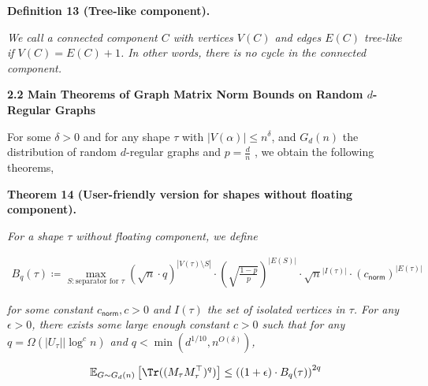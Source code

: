 

\par\medskip\noindent\textbf{
\textbf{Definition 13}\textbf{ }(Tree-like component)\textbf{.}
}\par



\emph{We call a connected component $C$ with vertices $V(C)$ and edges $E(C)$ tree-like if $V(C)=E(C)+1$. In other words, there is no cycle in the connected component.}\par







\par\medskip\noindent\textbf{
2.2 Main Theorems of Graph Matrix Norm Bounds on Random $d$-Regular Graphs}\par




For some $\delta>0$ and for any shape $\tau$ with $|V(\alpha)|\leq n^{\delta}$, and $G_{d}(n)$ the distribution of random $d$-regular graphs and $p=\frac{d}{n}$
, we obtain the following theorems,\par





\par\medskip\noindent\textbf{
\textbf{Theorem 14}\textbf{ }(User-friendly version for shapes without floating component)\textbf{.}
}\par



\emph{For a shape $\tau$ without floating component, we define}\par


\[\begin{gathered}
B_{q}(\tau)\coloneqq\max_{S:\text{separator for }\tau}(\sqrt{n}\cdot q)^{|V(\tau)\setminus S|}\cdot\left(\sqrt{\frac{1-p}{p}}\right)^{|E(S)|}\cdot\sqrt{n}^{|I(\tau)|}\cdot(c_{\mathsf{norm}})^{|E(\tau)|}
\end{gathered}\]


\emph{for some constant $c_{\mathsf{norm}},c>0$ and $I(\tau)$ the set of isolated vertices in $\tau$.
For any $\epsilon>0$, there exists some large enough constant $c>0$ such that for any $q=\Omega(|U_{\tau}||\log^{c}n)$ and $q<\min(d^{1/10},n^{O(\delta)})$,}\par


\[\begin{gathered}
\mathbb{E}_{G\sim G_{d}(n)}\left[\Tr((M_{\tau}M_{\tau}^{\top})^{q})\right]\leq\left((1+\epsilon)\cdot B_{q}(\tau)\right)^{2q}
\end{gathered}\]




